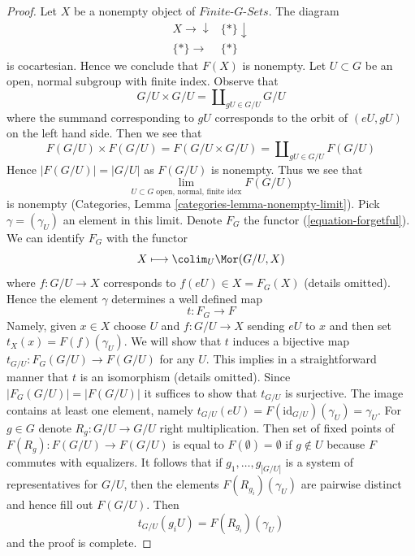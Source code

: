 \begin{proof}
Let $X$ be a nonempty object of $\textit{Finite-}G\textit{-Sets}$.
The diagram
$$
\begin{array}{cc}X \longrightarrow\downarrow & \{*\} \downarrow \\ \{*\} \longrightarrow & \{*\}\end{array}
$$
is cocartesian. Hence we conclude that $F(X)$ is nonempty.
Let $U \subset G$ be an open, normal subgroup with finite index.
Observe that
$$
G/U \times G/U = \coprod\nolimits_{gU \in G/U} G/U
$$
where the summand corresponding to $gU$ corresponds to the orbit of
$(eU, gU)$ on the left hand side. Then we see that
$$
F(G/U) \times F(G/U) = F(G/U \times G/U) = \coprod\nolimits_{gU \in G/U} F(G/U)
$$
Hence $|F(G/U)| = |G/U|$ as $F(G/U)$ is nonempty. Thus we see that
$$
\lim_{U \subset G\text{ open, normal, finite idex}} F(G/U)
$$
is nonempty (Categories, Lemma \ref{categories-lemma-nonempty-limit}).
Pick $\gamma = (\gamma_U)$ an element in this limit.
Denote $F_G$ the functor (\ref{equation-forgetful}). We can identify
$F_G$ with the functor
$$
X \longmapsto \colim_U \Mor(G/U, X)
$$
where $f : G/U \to X$ corresponds to $f(eU) \in X = F_G(X)$
(details omitted). Hence the element $\gamma$ determines
a well defined map
$$
t : F_G \longrightarrow F
$$
Namely, given $x \in X$ choose $U$ and $f : G/U \to X$ sending
$eU$ to $x$ and then set $t_X(x) = F(f)(\gamma_U)$.
We will show that $t$ induces a bijective map
$t_{G/U} : F_G(G/U) \to F(G/U)$ for any $U$.
This implies in a straightforward manner that $t$
is an isomorphism (details omitted).
Since $|F_G(G/U)| = |F(G/U)|$ it suffices to show
that $t_{G/U}$ is surjective. The image contains at least
one element, namely
$t_{G/U}(eU) = F(\text{id}_{G/U})(\gamma_U) = \gamma_U$.
For $g \in G$ denote $R_g : G/U \to G/U$ right multiplication.
Then set of fixed points of $F(R_g) : F(G/U) \to F(G/U)$
is equal to $F(\emptyset) = \emptyset$ if $g \not \in U$ because $F$
commutes with equalizers. It follows that if
$g_1, \ldots, g_{|G/U|}$ is a system of representatives
for $G/U$, then the elements $F(R_{g_i})(\gamma_U)$ are pairwise distinct
and hence fill out $F(G/U)$. Then
$$
t_{G/U}(g_iU) = F(R_{g_i})(\gamma_U)
$$
and the proof is complete.
\end{proof}

